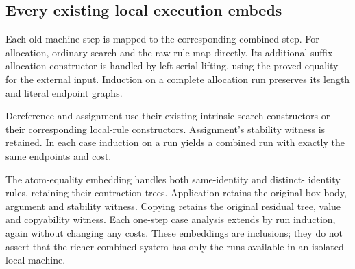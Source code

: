 
\subsection{Every existing local execution embeds}

Each old machine step is mapped to the corresponding combined step.
For allocation, ordinary search and the raw rule map directly. Its additional
suffix-allocation constructor is handled by left serial lifting, using the
proved equality for the external input. Induction on a complete allocation
run preserves its length and literal endpoint graphs.



Dereference and assignment use their existing intrinsic search
constructors or their corresponding local-rule constructors. Assignment's
stability witness is retained. In each case induction on a run yields a
combined run with exactly the same endpoints and cost.





The atom-equality embedding handles both same-identity and distinct-
identity rules, retaining their contraction trees. Application retains the
original box body, argument and stability witness. Copying retains the original
residual tree, value and copyability witness. Each one-step case analysis
extends by run induction, again without changing any costs. These embeddings
are inclusions; they do not assert that the richer combined system has only
the runs available in an isolated local machine.





